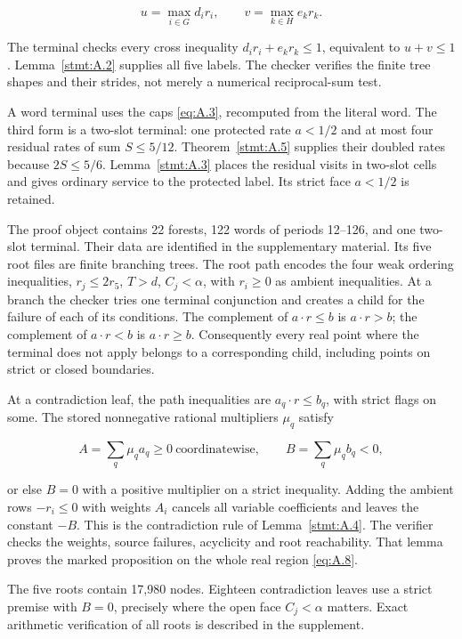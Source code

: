 \documentclass[11pt,a4paper]{article}
\begin{document}
\[
u=\max_{i\in G}d_i r_i,\qquad
v=\max_{k\in H}e_k r_k.
\]

The terminal checks every cross inequality \(d_i r_i+e_k r_k\le1\), equivalent to \(u+v\le1\). Lemma~\ref{stmt:A.2} supplies all five labels. The checker verifies the finite tree shapes and their strides, not merely a numerical reciprocal-sum test.

A word terminal uses the caps \eqref{eq:A.3}, recomputed from the literal word. The third form is a two-slot terminal: one protected rate \(a<1/2\) and at most four residual rates of sum \(S\le5/12\). Theorem~\ref{stmt:A.5} supplies their doubled rates because \(2S\le5/6\). Lemma~\ref{stmt:A.3} places the residual visits in two-slot cells and gives ordinary service to the protected label. Its strict face \(a<1/2\) is retained.

The proof object contains 22 forests, 122 words of periods 12--126, and one two-slot terminal. Their data are identified in the supplementary material. Its five root files are finite branching trees. The root path encodes the four weak ordering inequalities, \(r_j\le2r_5\), \(T>d\), \(C_j<\alpha\), with \(r_i\ge0\) as ambient inequalities. At a branch the checker tries one terminal conjunction and creates a child for the failure of each of its conditions. The complement of \(a\cdot r\le b\) is \(a\cdot r>b\); the complement of \(a\cdot r<b\) is \(a\cdot r\ge b\). Consequently every real point where the terminal does not apply belongs to a corresponding child, including points on strict or closed boundaries.

At a contradiction leaf, the path inequalities are \(a_q\cdot r\le b_q\), with strict flags on some. The stored nonnegative rational multipliers \(\mu_q\) satisfy

\begin{equation}
A=\sum_q\mu_q a_q\ge0\ \text{coordinatewise},\qquad
B=\sum_q\mu_q b_q<0,
\tag{A.9}\label{eq:A.9}
\end{equation}

or else \(B=0\) with a positive multiplier on a strict inequality. Adding the ambient rows \(-r_i\le0\) with weights \(A_i\) cancels all variable coefficients and leaves the constant \(-B\). This is the contradiction rule of Lemma~\ref{stmt:A.4}. The verifier checks the weights, source failures, acyclicity and root reachability. That lemma proves the marked proposition on the whole real region \eqref{eq:A.8}.

The five roots contain 17,980 nodes. Eighteen contradiction leaves use a strict premise with \(B=0\), precisely where the open face \(C_j<\alpha\) matters. Exact arithmetic verification of all roots is described in the supplement.
\end{document}
